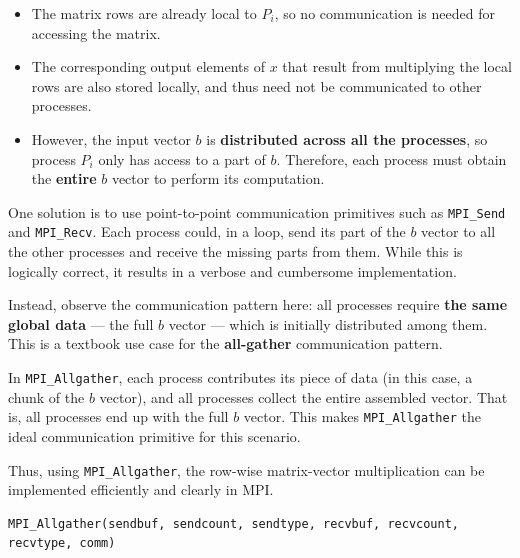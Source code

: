 \documentclass[12pt]{book}
\begin{document}
\begin{itemize}
    \item The matrix rows are already local to $P_i$, so no communication is needed for accessing the matrix.
    \item The corresponding output elements of $x$ that result from multiplying the local rows are also stored locally, and thus need not be communicated to other processes.
    \item However, the input vector $b$ is \textbf{distributed across all the processes}, so process $P_i$ only has access to a part of $b$. Therefore, each process must obtain the \textbf{entire} $b$ vector to perform its computation.
\end{itemize}

One solution is to use point-to-point communication primitives such as \texttt{MPI\_Send} and \texttt{MPI\_Recv}. Each process could, in a loop, send its part of the $b$ vector to all the other processes and receive the missing parts from them. While this is logically correct, it results in a verbose and cumbersome implementation.

Instead, observe the communication pattern here: all processes require \textbf{the same global data} — the full $b$ vector — which is initially distributed among them. This is a textbook use case for the \textbf{all-gather} communication pattern.

In \texttt{MPI\_Allgather}, each process contributes its piece of data (in this case, a chunk of the $b$ vector), and all processes collect the entire assembled vector. That is, all processes end up with the full $b$ vector. This makes \texttt{MPI\_Allgather} the ideal communication primitive for this scenario.

Thus, using \texttt{MPI\_Allgather}, the row-wise matrix-vector multiplication can be implemented efficiently and clearly in MPI.
\begin{lstlisting}[style=cppstyle]
MPI_Allgather(sendbuf, sendcount, sendtype, recvbuf, recvcount, recvtype, comm)
\end{lstlisting}
\end{document}
